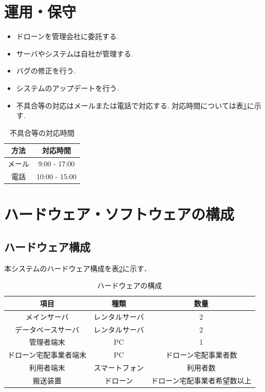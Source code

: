 \documentclass[a4paper, titlepage]{jsarticle}
\begin{document}
\section{運用・保守}
\begin{itemize}
\item ドローンを管理会社に委託する.
\item サーバやシステムは自社が管理する.
\item バグの修正を行う.
\item システムのアップデートを行う.
\item 不具合等の対応はメールまたは電話で対応する. 対応時間については表\ref{tb:huguai}に示す.
\end{itemize}

\begin{table}[htbp]
  \centering
  \begin{tabular}{c|c} \hline
    方法 & 対応時間 \\ \hline
    メール & 9:00 - 17:00 \\
    電話 & 10:00 - 15:00 \\ \hline
  \end{tabular}
  \caption{不具合等の対応時間}
  \label{tb:huguai}
\end{table}

\section{ハードウェア・ソフトウェアの構成}
\subsection{ハードウェア構成}
本システムのハードウェア構成を表\ref{fig:hardware}に示す．
\begin{table}[H]
        \begin{center}
                \caption{ハードウェアの構成}
                \label{fig:hardware}
                \begin{tabular}{ccc} \hline
                        項目          & 種類      & 数量             \\ \hline \hline
                        メインサーバ      & レンタルサーバ & 2              \\
                        データベースサーバ   & レンタルサーバ & 2              \\
                        管理者端末       & PC      & 1              \\
                        ドローン宅配事業者端末 & PC      & ドローン宅配事業者数     \\
                        利用者端末       & スマートフォン & 利用者数           \\
                        搬送装置        & ドローン    & ドローン宅配事業者希望数以上 \\ \hline
                \end{tabular}
        \end{center}
\end{table}
\end{document}
